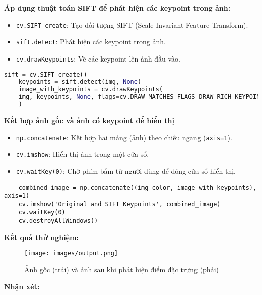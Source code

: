 \textbf{Áp dụng thuật toán SIFT để phát hiện các keypoint trong ảnh:}
\begin{itemize}
	\item \texttt{cv.SIFT\_create}: Tạo đối tượng SIFT (Scale-Invariant Feature Transform).
	\item \texttt{sift.detect}: Phát hiện các keypoint trong ảnh.
	\item \texttt{cv.drawKeypoints}: Vẽ các keypoint lên ảnh đầu vào.
\end{itemize}

\begin{lstlisting}[language=Python]
	sift = cv.SIFT_create()
	keypoints = sift.detect(img, None)
	image_with_keypoints = cv.drawKeypoints(
	img, keypoints, None, flags=cv.DRAW_MATCHES_FLAGS_DRAW_RICH_KEYPOINTS
	)
\end{lstlisting}


\textbf{Kết hợp ảnh gốc và ảnh có keypoint để hiển thị}

\begin{itemize}
	\item \texttt{np.concatenate}: Kết hợp hai mảng (ảnh) theo chiều ngang (\texttt{axis=1}).
	\item \texttt{cv.imshow}: Hiển thị ảnh trong một cửa sổ.
	\item \texttt{cv.waitKey(0)}: Chờ phím bấm từ người dùng để đóng cửa sổ hiển thị.
\end{itemize}

\begin{lstlisting}
	combined_image = np.concatenate((img_color, image_with_keypoints), axis=1)
	cv.imshow('Original and SIFT Keypoints', combined_image)
	cv.waitKey(0)
	cv.destroyAllWindows()
\end{lstlisting}

\textbf{Kết quả thử nghiệm:}

\begin{figure}[H]
	\centering
	\texttt{[image: images/output.png]}
	\caption{Ảnh gốc (trái) và ảnh sau khi phát hiện điểm đặc trưng (phải)}
\end{figure}

\textbf{Nhận xét:}

